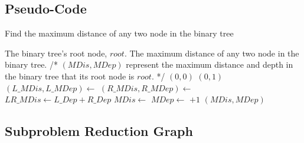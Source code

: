 \documentclass[UTF8,a4paper]{article}
\begin{document}
	\subsection{Pseudo-Code}
	\begin{algorithm}[htb]
		\caption{Find the maximum distance of any two node in the binary tree}
		\begin{algorithmic}[1]
			\Require
			The binary tree's root node, $ root $.
			\Ensure
			The maximum distance of any two node in the binary tree.
				\State /* $ (MDis,MDep) $ represent the maximum distance and depth in the binary tree that its root node is $ root $. */
					\State \Return $ (0,0) $
					\State \Return $ (0,1) $
				\EndIf
				\State $ (L\_MDis,L\_MDep) \gets $  
				\State $ (R\_MDis,R\_MDep) \gets $  
				\State $ LR\_MDis \gets L\_Dep + R\_Dep $
				\State $ MDis \gets $  
				\State $ MDep \gets $  $ + 1 $
				\State \Return $ (MDis,MDep) $
			\EndFunction
		\end{algorithmic}
	\end{algorithm}
	\subsection{Subproblem Reduction Graph}
	
\end{document}
